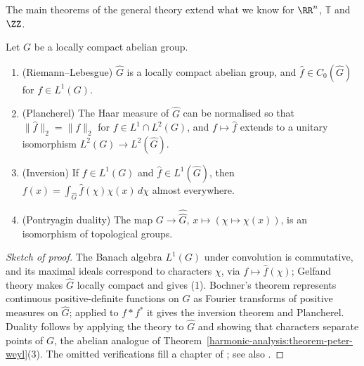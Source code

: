The main theorems of the general theory extend what we know for $\RR^n$, $\mathbb{T}$ and $\ZZ$.

\begin{theorem}\label{harmonic-analysis:theorem-pontryagin}
Let $G$ be a locally compact abelian group.
\begin{enumerate}
\item (Riemann--Lebesgue) $\widehat G$ is a locally compact abelian group, and $\hat f \in C_0(\widehat G)$ for $f \in L^1(G)$.
\item (Plancherel) The Haar measure of $\widehat G$ can be normalised so that $\|\hat f\|_2 = \|f\|_2$ for $f \in L^1 \cap L^2(G)$, and $f \mapsto \hat f$ extends to a unitary isomorphism $L^2(G) \to L^2(\widehat G)$.
\item (Inversion) If $f \in L^1(G)$ and $\hat f \in L^1(\widehat G)$, then $f(x) = \int_{\widehat G}\hat f(\chi)\chi(x)\,d\chi$ almost everywhere.
\item (Pontryagin duality) The map $G \to \widehat{\widehat G}$, $x \mapsto (\chi \mapsto \chi(x))$, is an isomorphism of topological groups.
\end{enumerate}
\end{theorem}

\begin{proof}[Sketch of proof]
The Banach algebra $L^1(G)$ under convolution is commutative, and its maximal ideals correspond to characters $\chi$, via $f \mapsto \hat f(\chi)$; Gelfand theory makes $\widehat G$ locally compact and gives (1). Bochner's theorem
represents continuous positive-definite functions on $G$ as Fourier transforms of positive measures on $\widehat G$; applied to $f * f^*$ it gives the inversion theorem and Plancherel. Duality follows by applying the theory to
$\widehat G$ and showing that characters separate points of $G$, the abelian analogue of Theorem~\ref{harmonic-analysis:theorem-peter-weyl}(3). The omitted verifications fill a chapter of \cite{folland-abstract}; see also
\cite{rudin-fourier-groups}.
\end{proof}

